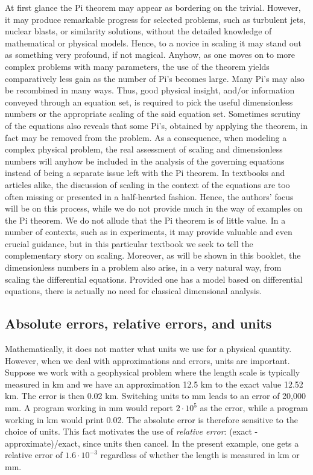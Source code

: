 \documentclass[graybox,envcountchap,sectrefs,final]{svmonodo}
\begin{document}
At first glance the Pi theorem may appear as bordering on the
trivial. However, it may produce remarkable progress for selected
problems, such as turbulent jets, nuclear blasts, or similarity
solutions, without the detailed knowledge of mathematical or physical
models. Hence, to a novice in scaling it may stand out as something
very profound, if not magical.  Anyhow, as one moves on to more complex
problems with many parameters, the use of the theorem yields
comparatively less gain as the number of Pi's becomes large.
Many Pi's may also be
recombined in many ways. Thus, good
physical insight, and/or information conveyed through an equation set,
is required to
pick the useful dimensionless numbers or the appropriate scaling of
the said equation set.  Sometimes scrutiny of the equations also
reveals that some Pi's, obtained by applying the theorem, in fact
may be removed from the problem.  As a consequence, when
modeling a complex physical problem, the real assessment of scaling
and dimensionless numbers will anyhow be included in the
analysis of the governing equations instead of being a separate issue left
with the Pi theorem. In textbooks and articles alike, the discussion of
scaling in the context of the equations are too often missing or
presented in a half-hearted fashion. Hence, the authors' focus will be
on this process, while we do not provide much in the way of examples
on the Pi theorem.  We do not allude that the Pi theorem is of little
value.  In a number of contexts, such as in experiments, it may
provide valuable and even crucial guidance, but in this particular
textbook we seek to tell the complementary story on scaling.
Moreover, as will be shown in this booklet, the dimensionless numbers in
a problem also arise, in a very natural way, from scaling the
differential equations.  Provided one has a model based on
differential equations, there is actually no need for classical
dimensional analysis.


\subsection{Absolute errors, relative errors, and units}

Mathematically, it does not matter what units we use for a physical
quantity. However, when we deal with approximations and errors,
units are important. Suppose we work with a geophysical problem where
the length scale is typically measured in km and we have an approximation
12.5 km to the exact value 12.52 km. The error is then 0.02 km.
Switching units to mm leads to an error of 20,000 mm. A program working
in mm would report $2\cdot 10^5$ as the error, while a program working
in km would print 0.02. The absolute error is therefore sensitive to
the choice of units. This fact motivates the use of \emph{relative
error}: (exact - approximate)/exact, since units then cancel.
In the present example, one gets a relative error of $1.6\cdot 10^{-3}$
regardless of whether the length is measured in km or mm.
\end{document}
